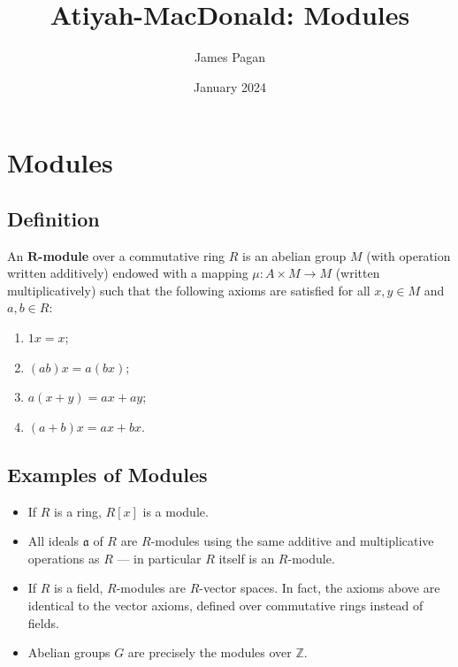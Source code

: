 \documentclass[11pt]{article}
\title{Atiyah-MacDonald: Modules}
\author{James Pagan}
\date{January 2024}
\begin{document}
\maketitle
\tableofcontents

\newpage


\section{Modules}


\subsection{Definition}

An $\mathbf{R}$\textbf{-module} over a commutative ring $R$ is an abelian group $M$ (with operation written additively) endowed with a mapping $\mu : A \times M \to M$ (written multiplicatively) such that the following axioms are satisfied for all $x, y \in M$ and $a, b \in R$:
\begin{enumerate}
	\item $1x = x$;
	\item $(ab)x = a(bx)$;
	\item $a(x + y) = ax + ay$;
	\item $(a + b)x = ax + bx$.
\end{enumerate}


\subsection{Examples of Modules}

\begin{itemize}
	\item If $R$ is a ring, $R[x]$ is a module.
	\item All ideals $\mathfrak{a}$ of $R$ are $R$-modules using the same additive and multiplicative operations as $R$ --- in particular $R$ itself is an $R$-module.
	\item If $R$ is a field, $R$-modules are $R$-vector spaces. In fact, the axioms above are identical to the vector axioms, defined over commutative rings instead of fields.
	\item Abelian groups $G$ are precisely the modules over $\mathbb{Z}$.
\end{itemize}
\end{document}
